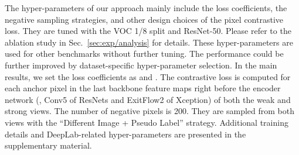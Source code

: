 The hyper-parameters of our approach mainly include the loss coefficients, the negative sampling strategies, and other design choices of the pixel contrastive loss. They are tuned with the VOC 1/8 split and ResNet-50. Please refer to the ablation study in Sec.~\ref{sec:exp/analysis} for details. These hyper-parameters are used for other benchmarks without further tuning. The performance could be further improved by dataset-specific hyper-parameter selection. In the main results, we set the loss coefficients as  and . The contrastive loss is computed for each anchor pixel in the last backbone feature maps right before the encoder network (\ie, Conv5 of ResNets and ExitFlow2 of Xception) of both the weak and strong views. The number of negative pixels is 200. They are sampled from both views with the ``Different Image + Pseudo Label'' strategy. Additional training details and DeepLab-related hyper-parameters are presented in the supplementary material.


